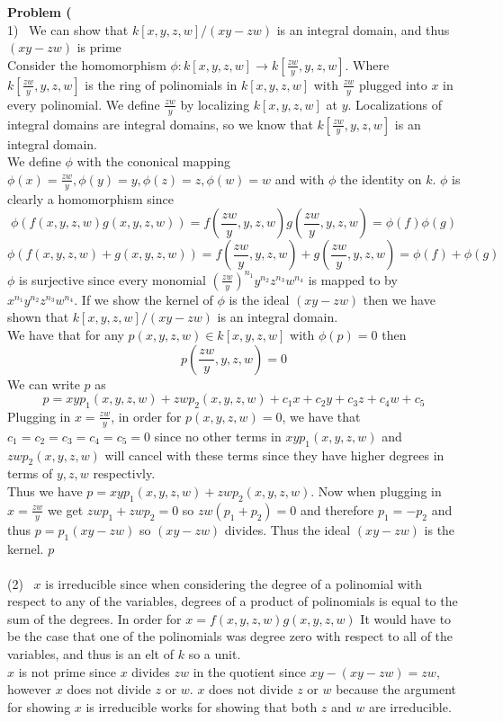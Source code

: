 \documentclass[12pt]{article}
\newenvironment{ques}[1]{\textbf{Problem #1}\vspace{1 mm}\\ }{\bigskip}
\theoremstyle{definition}
\renewcommand{\l}{\left }
\renewcommand{\r}{\right }
\begin{document}
\begin{ques}{1.6}
	(1) \ We can show that $k[x,y,z,w]/(xy - zw)$ is an integral domain, and
	thus $(xy-zw)$ is prime\\
	Consider the homomorphism $\phi :k[x,y,z,w] \to k[\frac{zw}{y}, y, z, w]$.
	Where $k[\frac{zw}{y}, y, z, w]$ is the ring of polinomials in $k[x,y,z,w]$
	with $\frac{zw}{y}$ plugged into $x$ in every polinomial. We define
	$\frac{zw}{y}$ by localizing $k[x,y,z,w]$ at $y$. Localizations of integral
	domains are integral domains, so we know that $k[\frac{zw}{y}, y, z, w]$ is
	an integral domain.\\
	We define $\phi$ with the cononical mapping $\phi(x) = \frac{zw}{y},
	\phi(y) = y, \phi(z) = z, \phi(w) = w$ and with $\phi$ the identity on $k$.
	$\phi$ is clearly a homomorphism since
	$$\phi(f(x,y,z,w)g(x,y,z,w)) = f(\frac{zw}{y}, y, z, w)g(\frac{zw}{y}, y,
	z, w) = \phi(f)\phi(g)$$ 
	$$\phi(f(x,y,z,w) + g(x,y,z,w)) = f(\frac{zw}{y}, y, z, w) +
	g(\frac{zw}{y}, y, z, w) = \phi(f) + \phi(g)$$ 
	$\phi$ is surjective since every monomial $\l(\frac{zw}{y}\r)^{n_1} y^{n_2}
	z^{n_3} w^{n_4}$ is mapped to by $x^{n_1} y^{n_2} z^{n_3} w^{n_4}$. If we
	show the kernel of $\phi$ is the ideal $(xy-zw)$ then we have shown that
	$k[x,y,z,w]/(xy -zw)$ is an integral domain.\\
	We have that for any $p(x,y,z,w) \in k[x,y,z,w]$ with $\phi(p) = 0$ then
	$$p(\frac{zw}{y},y,z,w) = 0$$
	We can write $p$ as 
	$$p = xyp_1(x,y,z,w) + zwp_2(x,y,z,w) + c_1x + c_2y + c_3z + c_4w + c_5$$
	Plugging in $x = \frac{zw}{y}$, in order for $p(x,y,z,w) = 0$, we have that
	$c_1 = c_2 = c_3 = c_4 = c_5 = 0$ since no other terms in $xyp_1(x,y,z,w)$
	and $zwp_2(x,y,z,w)$ will cancel with these terms since they have higher
	degrees in terms of $y,z,w$ respectivly.\\
	Thus we have $p = xyp_1(x,y,z,w) + zwp_2(x,y,z,w)$.
	Now when plugging in $x = \frac{zw}{y}$ we get $zwp_1 + zwp_2 = 0$ so
	$zw(p_1 + p_2) = 0$ and therefore $p_1 = -p_2$ and thus $p = p_1(xy - zw)$
	so $(xy- zw)$ divides. Thus the ideal $(xy-zw)$ is the kernel.
	$p$\\
\\
	(2) \ $x$ is irreducible since when considering the degree
	of a polinomial with respect to any of the variables, degrees of a product
	of polinomials is equal to the sum of the degrees. In order for $x =
	f(x,y,z,w)g(x,y,z,w)$ It would have to be the case that one of the
	polinomials was degree zero with respect to all of the variables, and thus
	is an elt of $k$ so a unit.\\
	$x$ is not prime since $x$ divides $zw$ in the quotient since $xy - (xy -
	zw) = zw$, however $x$ does not divide $z$ or $w$. $x$ does not divide $z$
	or $w$  because the argument for showing $x$ is irreducible works for
	showing that both $z$ and $w$ are irreducible.

\end{ques}
\end{document}

